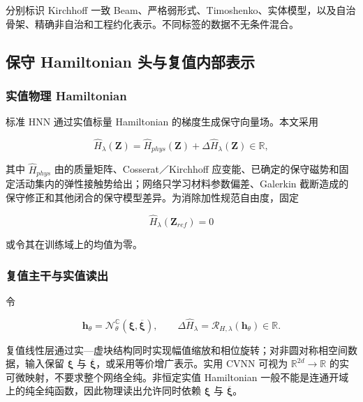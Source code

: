 分别标识 Kirchhoff 一致 Beam、严格弱形式、Timoshenko、实体模型，以及自治骨架、精确非自治和工程约化表示。不同标签的数据不无条件混合。

\subsection{保守 Hamiltonian 头与复值内部表示}\label{sec:chnn-4-2}

\subsubsection{实值物理 Hamiltonian}\label{sec:chnn-4-2-1}

标准 HNN 通过实值标量 Hamiltonian 的梯度生成保守向量场\cite{Greydanus2019HNN}。本文采用

\begin{equation}
\label{eq:chnn-4-4}
\boxed{{\widehat{H}}_{\lambda}\left( \mathbf{Z} \right) = {\widehat{H}}_{phys}\left( \mathbf{Z} \right) + \Delta{\widehat{H}}_{\lambda}\left( \mathbf{Z} \right) \in \mathbb{R},}
\end{equation}

其中 \({\widehat{H}}_{phys}\) 由的质量矩阵、Cosserat／Kirchhoff 应变能、已确定的保守磁势和固定活动集内的弹性接触势给出；网络只学习材料参数偏差、Galerkin 截断造成的保守修正和其他闭合的保守模型差异。为消除加性规范自由度，固定

\begin{equation}
\label{eq:chnn-4-5}
{\widehat{H}}_{\lambda}\left( \mathbf{Z}_{ref} \right) = 0
\end{equation}

或令其在训练域上的均值为零。

\subsubsection{复值主干与实值读出}\label{sec:chnn-4-2-2}

令

\begin{equation}
\label{eq:chnn-4-6}
\mathbf{h}_{\theta} = \mathcal{N}_{\theta}^{\mathbb{C}}\left( \bm{\xi},\overline{\bm{\xi}} \right),\quad\quad\Delta{\widehat{H}}_{\lambda} = \mathcal{R}_{H,\lambda}\left( \mathbf{h}_{\theta} \right) \in \mathbb{R}.
\end{equation}

复值线性层通过实---虚块结构同时实现幅值缩放和相位旋转；对非圆对称相空间数据，输入保留 \(\bm{\xi}\) 与 \(\overline{\bm{\xi}}\)，或采用等价增广表示。实用 CVNN 可视为 \(\mathbb{R}^{2d} \rightarrow \mathbb{R}\) 的实可微映射，不要求整个网络全纯\cite{Trabelsi2018DeepComplex,Hirose2012CVNN}。非恒定实值 Hamiltonian 一般不能是连通开域上的纯全纯函数，因此物理读出允许同时依赖 \(\bm{\xi}\) 与 \(\overline{\bm{\xi}}\)。


